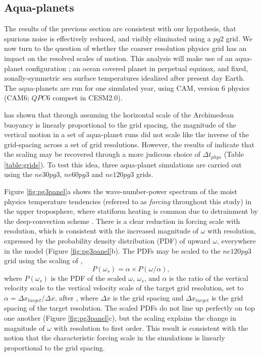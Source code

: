 \documentclass{agujournal}
\begin{document}
\subsection{Aqua-planets}

The results of the previous section are consistent with our hypothesis, that spurious noise is effectively reduced, and visibly eliminated using a $pg2$ grid. We now turn to the question of whether the coarser resolution physics grid has an impact on the resolved scales of motion. This analysis will make use of an aqua-planet configuration \citep{NH2000ASL,MWO2016JAMES}; an ocean covered planet in perpetual equinox, and fixed, zonally-symmetric sea surface temperatures idealized after present day Earth. The aqua-planets are run for one simulated year, using CAM, version 6 physics (CAM6; $QPC6$ compset in CESM2.0).

\cite{HR2017JCLIM} has shown that through assuming the horizontal scale of the Archimedean buoyancy is linearly proportional to the grid spacing, the magnitude of the vertical motion in a set of aqua-planet runs did not scale like the inverse of the grid-spacing across a set of grid resolutions. However, the results of \cite{HR2018JAMES} indicate that the scaling may be recovered through a more judicous choice of $\Delta t_{phys}$ (Table \ref{table:grids}). To test this idea, three aqua-planet simulations are carried out using the $ne30pg3$, $ne60pg3$ and $ne120pg3$ grids. 

Figure \ref{fig:pg3panel}a shows the wave-number-power spectrum of the moist physics temperature tendencies (referred to as {\em{forcing}} throughout this study) in the upper troposphere, where statiform heating is common due to detrainment by the deep-convection scheme \citep{ZM1995AO}. There is a clear reduction in forcing scale with resolution, which is consistent with the increased magnitude of $\omega$ with resolution, expressed by the probability density distribution (PDF) of upward $\omega$, everywhere in the model (Figure \ref{fig:pg3panel}b). The PDFs may be scaled to the $ne120pg3$ grid using the scaling of \cite{PG2006JAS}, 
\begin{equation}
P(\omega_{s}) = \alpha \times P(\omega/\alpha),
\end{equation}
where $P(\omega_{s})$ is the PDF of the scaled $\omega$, $\omega_{s}$, and $\alpha$ is the ratio of the vertical velocity scale to the vertical velocity scale of the target grid resolution, set to $\alpha = \Delta x_{target}/\Delta x$, after \citep{HR2018JAMES}, where $\Delta x$ is the grid spacing and $\Delta x_{target}$ is the grid spacing of the target resolution. The scaled PDFs do not line up perfectly on top one another (Figure \ref{fig:pg3panel}c), but the scaling explains the change in magnitude of $\omega$ with resolution to first order. This result is consistent with the notion that the characteristic forcing scale in the simulations is linearly proportional to the grid spacing.
\end{document}
